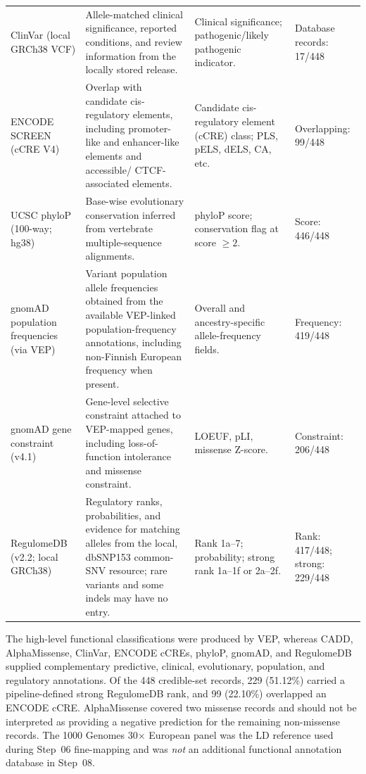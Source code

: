 \documentclass[11pt,a4paper]{article}
\begin{document}
\begin{longtable}{@{}p{2.45cm}p{5.65cm}p{3.25cm}p{2.10cm}@{}}
ClinVar
(local GRCh38 VCF) \cite{Landrum2018} &
Allele-matched clinical significance, reported conditions,
and review information from the locally stored release. &
Clinical significance; pathogenic/likely pathogenic
indicator. &
Database records: 17/448\\

ENCODE SCREEN
(cCRE V4) \cite{ENCODE2020} &
Overlap with candidate cis-regulatory elements, including
promoter-like and enhancer-like elements and accessible/
CTCF-associated elements. &
Candidate cis-regulatory element (cCRE) class;
PLS, pELS, dELS, CA, etc. &
Overlapping: 99/448\\

UCSC phyloP
(100-way; hg38) &
Base-wise evolutionary conservation inferred from vertebrate
multiple-sequence alignments. &
phyloP score; conservation flag at score $\geq 2$. &
Score: 446/448\\

gnomAD population
frequencies
(via VEP) &
Variant population allele frequencies obtained from the
available VEP-linked population-frequency annotations,
including non-Finnish European frequency when present. &
Overall and ancestry-specific allele-frequency fields. &
Frequency: 419/448\\

gnomAD gene
constraint (v4.1) &
Gene-level selective constraint attached to VEP-mapped
genes, including loss-of-function intolerance and
missense constraint. &
LOEUF, pLI, missense Z-score. &
Constraint: 206/448\\

RegulomeDB
(v2.2; local GRCh38) &
Regulatory ranks, probabilities, and evidence for matching
alleles from the local, dbSNP153 common-SNV resource;
rare variants and some indels may have no entry. &
Rank 1a--7; probability; strong rank
1a--1f or 2a--2f. &
Rank: 417/448;
strong: 229/448\\

\end{longtable}
\endgroup

The high-level functional classifications were produced by VEP,
whereas CADD, AlphaMissense, ClinVar, ENCODE cCREs, phyloP,
gnomAD, and RegulomeDB supplied complementary predictive,
clinical, evolutionary, population, and regulatory annotations.
Of the 448 credible-set records, 229 (51.12\%) carried a
pipeline-defined strong RegulomeDB rank, and 99 (22.10\%)
overlapped an ENCODE cCRE. AlphaMissense covered two
missense records and should not be interpreted as providing
a negative prediction for the remaining non-missense records.
The 1000 Genomes 30$\times$ European panel was the LD reference
used during Step~06 fine-mapping and was \emph{not} an additional
functional annotation database in Step~08.
\end{document}

